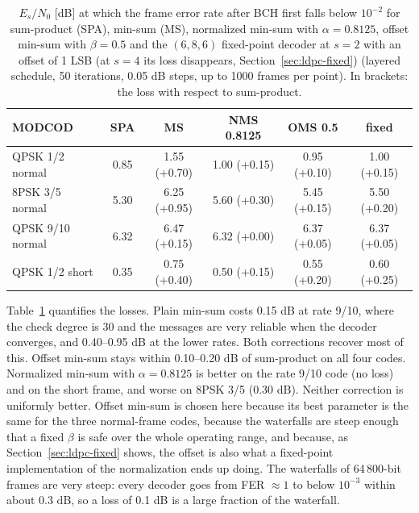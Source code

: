 \begin{table} \centering
\small \setlength{\tabcolsep}{4pt}
\begin{tabular}{|l|c|c|c|c|c|}
\hline
MODCOD & SPA & MS & NMS 0.8125 & OMS 0.5 & fixed \\
\hline
QPSK 1/2 normal & 0.85 & 1.55 (+0.70) & 1.00 (+0.15) & 0.95 (+0.10) & 1.00 (+0.15) \\
8PSK 3/5 normal & 5.30 & 6.25 (+0.95) & 5.60 (+0.30) & 5.45 (+0.15) & 5.50 (+0.20) \\
QPSK 9/10 normal & 6.32 & 6.47 (+0.15) & 6.32 (+0.00) & 6.37 (+0.05) & 6.37 (+0.05) \\
QPSK 1/2 short & 0.35 & 0.75 (+0.40) & 0.50 (+0.15) & 0.55 (+0.20) & 0.60 (+0.25) \\
\hline
\end{tabular}
\caption{\(E_s/N_0\) [dB] at which the frame error rate after BCH first falls below \(10^{-2}\) for sum-product (SPA), min-sum (MS), normalized min-sum with \(\alpha = 0.8125\), offset min-sum with \(\beta = 0.5\) and the \((6, 8, 6)\) fixed-point decoder at \(s = 2\) with an offset of 1 LSB (at \(s = 4\) its loss disappears, Section~\ref{sec:ldpc-fixed}) (layered schedule, 50 iterations, 0.05 dB steps, up to 1000 frames per point). In brackets: the loss with respect to sum-product.} \label{tb:ldpc-thresholds}
\end{table}

Table~\ref{tb:ldpc-thresholds} quantifies the losses. Plain min-sum costs 0.15 dB at rate 9/10, where the check degree is 30 and the messages are very reliable when the decoder converges, and 0.40--0.95 dB at the lower rates. Both corrections recover most of this. Offset min-sum stays within 0.10--0.20 dB of sum-product on all four codes. Normalized min-sum with \(\alpha = 0.8125\) is better on the rate 9/10 code (no loss) and on the short frame, and worse on 8PSK 3/5 (0.30 dB). Neither correction is uniformly better. Offset min-sum is chosen here because its best parameter is the same for the three normal-frame codes, because the waterfalls are steep enough that a fixed \(\beta\) is safe over the whole operating range, and because, as Section~\ref{sec:ldpc-fixed} shows, the offset is also what a fixed-point implementation of the normalization ends up doing. The waterfalls of 64\,800-bit frames are very steep: every decoder goes from FER \(\approx 1\) to below \(10^{-3}\) within about 0.3 dB, so a loss of 0.1 dB is a large fraction of the waterfall.

